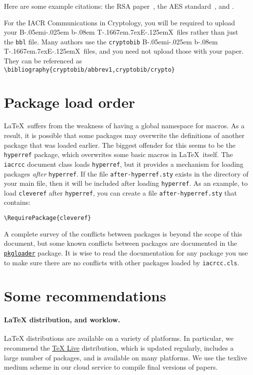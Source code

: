 \documentclass{iacrcc}
\def\BibTeX{{\rm B\kern-.05em{\sc i\kern-.025em b}\kern-.08em
    T\kern-.1667em\lower.7ex\hbox{E}\kern-.125emX}}
\begin{document}
Here are some example citations: the RSA paper~\cite{RSA78}, the AES
standard~\cite{AES-FIPS}, and \cite{DBLP:conf/crypto/Kocher96}.

For the IACR Communications in Cryptology, you will be required to
upload your \BibTeX\ files rather than just the \texttt{bbl} file.
Many authors use the \texttt{cryptobib} \BibTeX\ files, and you need
not upload those with your paper. They can be referenced as
\texttt{\textbackslash bibliography\{cryptobib/abbrev1,cryptobib/crypto\}}

\section{Package load order}\label{sec:loadorder}

\LaTeX\ suffers from the weakness of having a global namespace for
macros. As a result, it is possible that some packages may overwrite
the definitions of another package that was loaded earlier. The
biggest offender for this seems to be the \texttt{hyperref} package,
which overwrites some basic macros in \LaTeX\ itself. The
\texttt{iacrcc} document class loads \texttt{hyperref}, but it
provides a mechanism for loading packages \emph{after} \texttt{hyperref}. If
the file \texttt{after-hyperref.sty} exists in the directory of your
main file, then it will be included after loading \texttt{hyperref}.
As an example, to load \texttt{cleveref} after \texttt{hyperref}, you
can create a file \texttt{after-hyperref.sty} that contains:
\begin{verbatim}
\RequirePackage{cleveref}
\end{verbatim}
A complete survey of the conflicts between packages is beyond the scope of this document, but
some known conflicts between packages are documented in the
\href{https://github.com/mhelvens/latex-pkgloader/blob/master/pkgloader-recommended.sty}{\texttt{pkgloader}}
package. It is wise to read the documentation for any package you use to make sure
there are no conflicts with other packages loaded by \texttt{iacrcc.cls}.

\section{Some recommendations}\label{sec:options}

\paragraph{\LaTeX{} distribution, and worklow.}  \LaTeX{}
distributions are available on a variety of platforms.  In particular,
we recommend the \href{https://www.tug.org/texlive/}{TeX Live}
distribution, which is updated regularly, includes a large number of
packages, and is available on many platforms. We use the texlive medium
scheme in our cloud service to compile final versions of papers.
\end{document}
